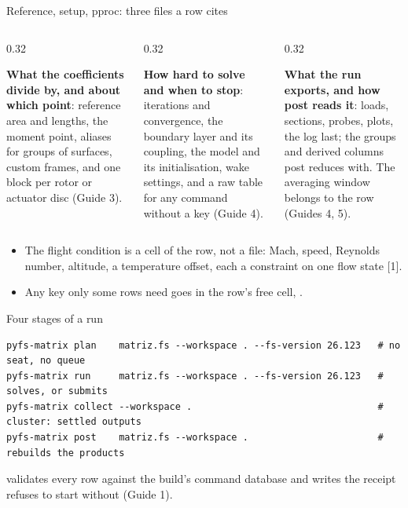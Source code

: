 \begin{frame}{Reference, setup, pproc: three files a row cites}
\begin{columns}[T]
\begin{column}{0.32\textwidth}
\begin{block}{}
\small \textbf{What the coefficients divide by, and about which point}:
reference area and lengths, the moment point, aliases for groups of
surfaces, custom frames, and one block per rotor or actuator disc
(Guide 3).
\end{block}
\end{column}
\begin{column}{0.32\textwidth}
\begin{block}{}
\small \textbf{How hard to solve and when to stop}: iterations and
convergence, the boundary layer and its coupling, the model and its
initialisation, wake settings, and a raw table for any command without a key
(Guide 4).
\end{block}
\end{column}
\begin{column}{0.32\textwidth}
\begin{block}{}
\small \textbf{What the run exports, and how post reads it}: loads, sections,
probes, plots, the log last; the groups and derived columns post reduces
with. The averaging window belongs to the row (Guides 4, 5).
\end{block}
\end{column}
\end{columns}
\vspace{2mm}
\begin{itemize}\small
  \item The flight condition is a cell of the row, not a file: Mach, speed,
        Reynolds number, altitude, a temperature offset, each a constraint on
        one flow state [1].
  \item Any key only some rows need goes in the row's free cell,
        .
\end{itemize}
\end{frame}

\begin{frame}[fragile]{Four stages of a run}
\begin{lstlisting}[style=ftsbase]
pyfs-matrix plan    matriz.fs --workspace . --fs-version 26.123   # no seat, no queue
pyfs-matrix run     matriz.fs --workspace . --fs-version 26.123   # solves, or submits
pyfs-matrix collect --workspace .                                 # cluster: settled outputs
pyfs-matrix post    matriz.fs --workspace .                       # rebuilds the products
\end{lstlisting}
{\small {} validates every row against the build's command database
and writes the receipt  refuses to start without (Guide 1).\par}
\end{frame}

